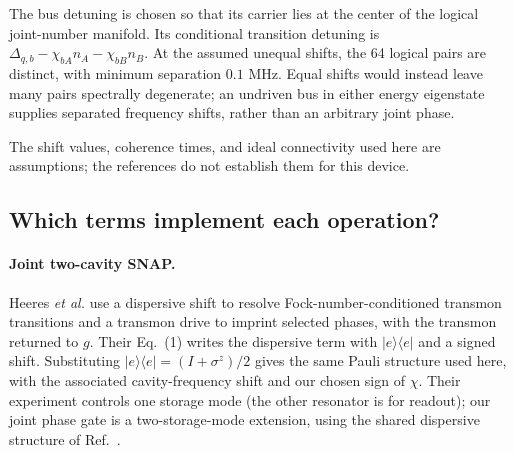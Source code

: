 \documentclass[aps,prb,reprint,amsmath,amssymb,nofootinbib]{revtex4-2}
\newcommand{\ket}[1]{\lvert#1\rangle}
\newcommand{\bra}[1]{\langle#1\rvert}
\begin{document}
The bus detuning is chosen so that its carrier lies at the center of the
logical joint-number manifold. Its conditional transition detuning is
$\Delta_{q,b}-\chi_{bA}n_A-\chi_{bB}n_B$. At the assumed unequal shifts,
the 64 logical pairs are distinct, with minimum separation $0.1$ MHz.
Equal shifts would instead leave many pairs spectrally degenerate; an
undriven bus in either energy eigenstate supplies separated frequency
shifts, rather than an arbitrary joint phase.

The shift values, coherence times, and ideal connectivity used here are
assumptions; the references do not establish them for this device.

\subsection{Which terms implement each operation?}

\paragraph{Joint two-cavity SNAP.}
Heeres \emph{et al.}\cite{Heeres2015} use a dispersive shift to resolve
Fock-number-conditioned transmon transitions and a transmon drive to
imprint selected phases, with the transmon returned to $g$. Their
Eq.~(1) writes the dispersive term with $\ket e\bra e$ and a signed
shift. Substituting $\ket e\bra e=(I+\sigma^z)/2$ gives the same Pauli
structure used here, with the associated cavity-frequency shift and
our chosen sign of $\chi$. Their experiment controls one storage mode
(the other resonator is for readout); our joint phase gate is a two-storage-mode
extension, using the shared dispersive structure of Ref.~.
\end{document}
